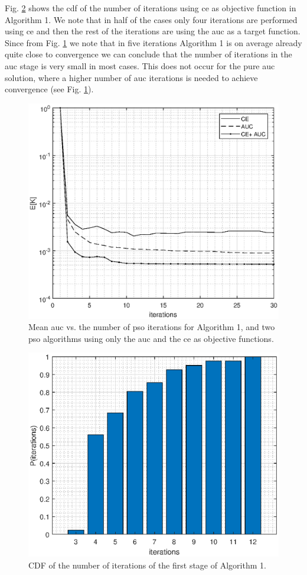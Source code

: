 \documentclass[conference]{IEEEtran}
\begin{document}
 
Fig. \ref{fig:cdf} shows the \ac{cdf} of the number of  iterations using \ac{ce} as objective function in Algorithm 1. We note that in half of the cases only four iterations are performed using \ac{ce} and then the rest of the iterations are using the \ac{auc} as a target function. Since from Fig. \ref{fig:CEvsAUC} we note that in five  iterations Algorithm 1 is on average already quite close to convergence we can conclude that the number of iterations in the \ac{auc} stage is very small in most cases. This does not occur for the pure \ac{auc} solution, where a higher number of \ac{auc} iterations is needed to achieve convergence (see  Fig. \ref{fig:CEvsAUC}).
\begin{figure} 
    \centering
    \includegraphics[width=0.9\columnwidth]{CE_vsAUC.eps}
    \caption{Mean \ac{auc} vs. the number of \ac{pso} iterations for Algorithm 1, and two \ac{pso} algorithms using only the  \ac{auc} and the \ac{ce} as objective functions. }
    \label{fig:CEvsAUC}
\end{figure}

\begin{figure} 
    \centering
    \includegraphics[width=0.9\columnwidth]{cdf_bar.eps}
    \caption{CDF of the number of iterations of the first stage of Algorithm 1. }
    \label{fig:cdf}
\end{figure}
 
\end{document}
